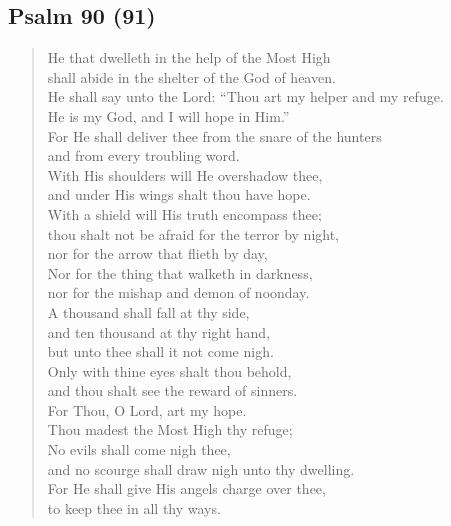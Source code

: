 {		\subsection*{Psalm 90 (91)}
			\begin{verse}
				He that dwelleth in the help of the Most High\nolinebreak\\
				shall abide in the shelter of the God of heaven.\nolinebreak\\
				He shall say unto the Lord: ``Thou art my helper and my refuge.\nolinebreak\\
				He is my God, and I will hope in Him.''\nolinebreak\\
				For He shall deliver thee from the snare of the hunters\nolinebreak\\
				and from every troubling word.\nolinebreak\\
				With His shoulders will He overshadow thee,\nolinebreak\\
				and under His wings shalt thou have hope.\nolinebreak\\
				With a shield will His truth encompass thee;\nolinebreak\\
				thou shalt not be afraid for the terror by night,\nolinebreak\\
				nor for the arrow that flieth by day,\nolinebreak\\
				Nor for the thing that walketh in darkness,\nolinebreak\\
				nor for the mishap and demon of noonday.\nolinebreak\\
				A thousand shall fall at thy side,\nolinebreak\\
				and ten thousand at thy right hand,\nolinebreak\\
				but unto thee shall it not come nigh.\nolinebreak\\
				Only with thine eyes shalt thou behold,\nolinebreak\\
				and thou shalt see the reward of sinners.\nolinebreak\\
				For Thou, O Lord, art my hope.\nolinebreak\\
				Thou madest the Most High thy refuge;\nolinebreak\\
				No evils shall come nigh thee,\nolinebreak\\
				and no scourge shall draw nigh unto thy dwelling.\nolinebreak\\
				For He shall give His angels charge over thee,\nolinebreak\\
				to keep thee in all thy ways.\nolinebreak\\

\end{verse}}
